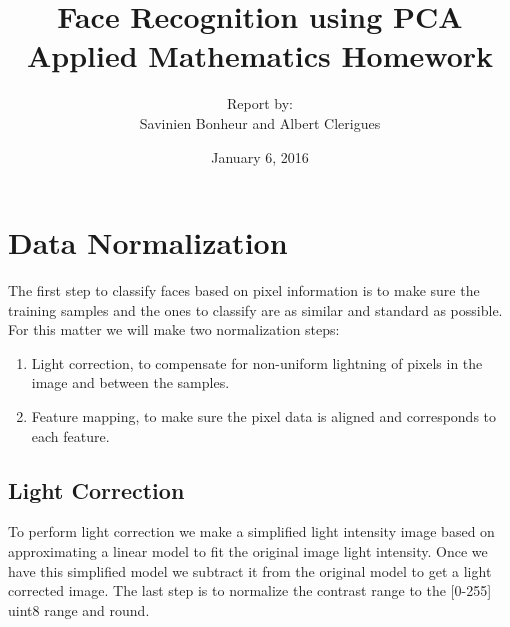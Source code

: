 \documentclass[12pt,a4paper,titlepage]{article}
\title{\Huge Face Recognition using PCA \\ \Large Applied Mathematics Homework}
\author{Report by: \\ Savinien Bonheur and Albert Clerigues}
\date {January 6, 2016}
\begin{document}
\maketitle

\pagebreak

\section{Data Normalization}

The first step to classify faces based on pixel information is to make sure the training samples and the ones to classify are as similar and standard as possible. For this matter we will make two normalization steps: 

\begin{enumerate}
	\item Light correction, to compensate for non-uniform lightning of pixels in the image and between the samples.
	\item Feature mapping, to make sure the pixel data is aligned and corresponds to each feature.
\end{enumerate}

\subsection{Light Correction}
To perform light correction we make a simplified light intensity image based on approximating a linear model to fit the original image light intensity. Once we have this simplified model we subtract it from the original model to get a light corrected image. The last step is to normalize the contrast range to the [0-255]  uint8 range and round.
\end{document}
